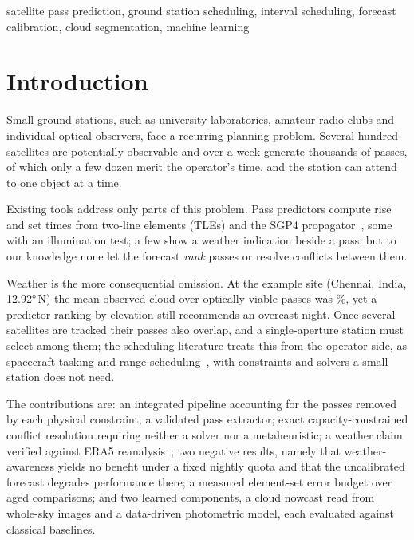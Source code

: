 \documentclass[conference]{IEEEtran}
\begin{document}
\begin{IEEEkeywords}
satellite pass prediction, ground station scheduling, interval scheduling,
forecast calibration, cloud segmentation, machine learning
\end{IEEEkeywords}

\section{Introduction}

Small ground stations, such as university laboratories, amateur-radio clubs and
individual optical observers, face a recurring planning problem. Several hundred
satellites are potentially observable and over a week generate thousands of
passes, of which only a few dozen merit the operator's time, and the station can
attend to one object at a time.

Existing tools address only parts of this problem. Pass predictors compute rise
and set times from two-line elements (TLEs) and the SGP4
propagator~\cite{vallado2022fundamentals, acciarini2025sgp4}, some with an
illumination test; a few show a weather indication beside a pass, but to our
knowledge none let the forecast \emph{rank} passes or resolve conflicts between
them.

Weather is the more consequential omission. At the example site (Chennai,
India, \ang{12.92}\,N) the mean observed cloud over optically viable passes was
\CloudChennai\%, yet a predictor ranking by elevation still recommends an
overcast night. Once several satellites are tracked their passes also overlap,
and a single-aperture station must select among them; the scheduling literature
treats this from the operator side, as spacecraft tasking and range
scheduling~\cite{li2023srsp, song2023cluster, ou2023drl, wang2024avns,
wang2021agile}, with constraints and solvers a small station does not need.

The contributions are: an integrated pipeline accounting for the
passes removed by each physical constraint; a validated pass extractor; exact
capacity-constrained conflict resolution requiring neither a solver nor a
metaheuristic; a weather claim verified against ERA5
reanalysis~\cite{hersbach2020era5}; two negative results, namely that
weather-awareness yields no benefit under a fixed nightly quota and that the
uncalibrated forecast degrades performance there; a measured element-set
error budget over \AgeComparisons{} aged comparisons; and two learned
components, a cloud nowcast read from whole-sky images and a data-driven
photometric model, each evaluated against classical baselines.
\end{document}
